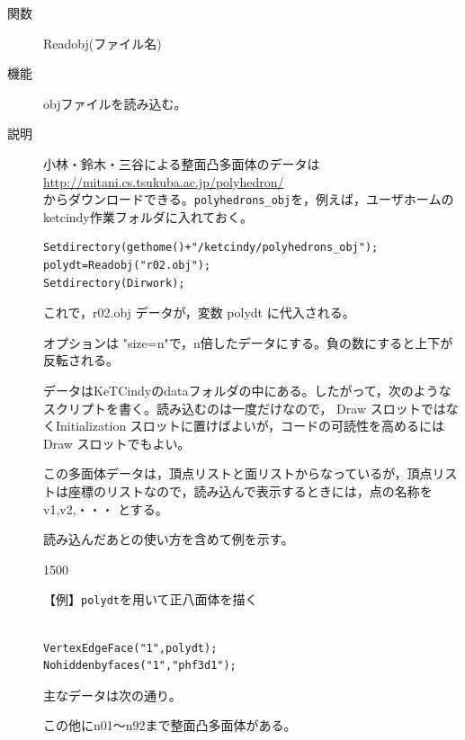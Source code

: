 \documentclass[papersize,a4paper,12pt,uplatex]{jsarticle}
\begin{document}
\begin{description}
\vspace{\baselineskip}
\hypertarget{readobj}{}
\item[関数]Readobj(ファイル名)
\item[機能]objファイルを読み込む。
\item[説明]小林・鈴木・三谷による整面凸多面体のデータは\\
\hspace*{20mm}\url{http://mitani.cs.tsukuba.ac.jp/polyhedron/}\\
からダウンロードできる。\verb|polyhedrons_obj|を，例えば，ユーザホームのketcindy作業フォルダに入れておく。
\begin{verbatim}
Setdirectory(gethome()+"/ketcindy/polyhedrons_obj");
polydt=Readobj("r02.obj");
Setdirectory(Dirwork);
\end{verbatim}
これで，r02.obj データが，変数 polydt に代入される。

オプションは "size=n"で，n倍したデータにする。負の数にすると上下が反転される。

データはKeTCindyのdataフォルダの中にある。したがって，次のようなスクリプトを書く。読み込むのは一度だけなので， Draw スロットではなくInitialization スロットに置けばよいが，コードの可読性を高めるには Draw スロットでもよい。

この多面体データは，頂点リストと面リストからなっているが，頂点リストは座標のリストなので，読み込んで表示するときには，点の名称を v1,v2,・・・ とする。

読み込んだあとの使い方を含めて例を示す。

\begin{layer}{150}{0}
\end{layer}


\vspace{\baselineskip}
【例】\verb|polydt|を用いて正八面体を描く


\begin{verbatim}

VertexEdgeFace("1",polydt);
Nohiddenbyfaces("1","phf3d1");
\end{verbatim}

主なデータは次の通り。

\vspace{\baselineskip}
  

この他にn01〜n92まで整面凸多面体がある。

 


\end{description}
\end{document}
